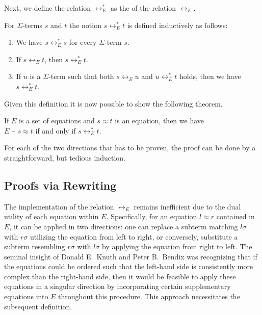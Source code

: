 Next, we define the relation $\leftrightarrow_E^*$ as the  of the relation
$\leftrightarrow_E$.
\begin{Definition}[$\leftrightarrow_E^*$]
  For $\Sigma$-terms $s$ and $t$ the notion $s \leftrightarrow_E^* t$ is defined inductively as follows:
  \begin{enumerate}
  \item We have $s \leftrightarrow_E^* s$ for every $\Sigma$-term $s$.
  \item If $s \leftrightarrow_E t$, then $s \leftrightarrow_E^* t$.
  \item If $u$ is a $\Sigma$-term such that both $s \leftrightarrow_E u$ and $u \leftrightarrow_E^* t$ holds,
        then we have $s \leftrightarrow_E^* t$. \eod
  \end{enumerate}
\end{Definition}

\noindent
Given this definition it is now possible to show the following theorem.

\begin{Theorem}
  If $E$ is a set of equations and $s \approx t$ is an equation, then we have
  \\[0.2cm]
  \hspace*{1.3cm}
  $E \vdash s \approx t$ \quad if and only if \quad $s \leftrightarrow_E^* t$.
\end{Theorem}
For each of the two directions that has to be proven, the proof can be done by a straightforward, but tedious
induction. 

\subsection{Proofs via Rewriting}
The implementation of the relation $\leftrightarrow_E$ remains inefficient due to the dual utility of each
equation within $E$. Specifically, for an equation $l \approx r$ contained in $E$, it can be applied in two
directions: one can replace a subterm matching $l\sigma$ with $r\sigma$ utilizing the equation from left to
right, or conversely, substitute a subterm resembling $r\sigma$ with $l\sigma$ by applying the equation from
right to left.  
The seminal insight of Donald E.~Knuth and Peter B.~Bendix
\cite{knuth:1970} was recognizing that if the equations could be ordered such that the left-hand side is
consistently more complex than the right-hand side, then it would be feasible to apply these equations in a
singular direction by incorporating certain supplementary equations into $E$ throughout this procedure. This
approach necessitates the subsequent definition. 


